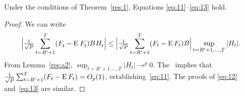 \documentclass[12pt,fleqn]{article}
\newcommand{\WesA}[1][]{\ocltb{t}
  (F_t^{#1} - \E^{#1} F_t^{#1}) B^{#1} H_t^{#1}}
\begin{document}
\begin{alem}\label{res:a4}
  Under the conditions of Theorem~\ref{res:1}, Equations
  \eqref{eq:11}--\eqref{eq:13} hold.
\end{alem}

\begin{proof}
We can write
\begin{equation*}
  \Big\lvert \WesA \Big\rvert \leq
  \Big\lvert \ocltb{t} (F_t - \E F_t) B \Big\rvert
  \sup_{t = R'+1,\dots,T} | H_t |.
\end{equation*}
From Lemma~\ref{res:a2}, $\sup_{t = R'+1,\dots,T} | H_t | \to^p 0$. The \clt\ implies
that $\tfrac{1}{\sqrt{P}} \sum_{t=R'+1}^T (F_t - \operatorname{E} F_t) = O_p(1)$,
establishing~\eqref{eq:11}. The proofs of \eqref{eq:12}
and~\eqref{eq:13} are similar.
\end{proof}


\end{document}
